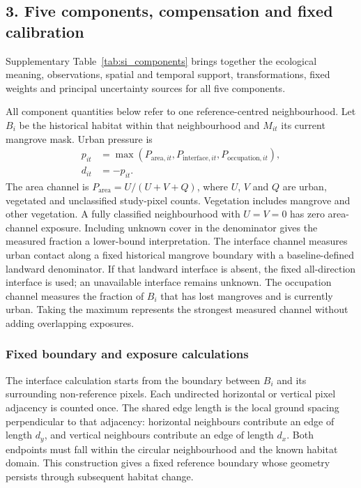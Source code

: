 \subsection{3. Five components, compensation and fixed calibration}

Supplementary Table~\ref{tab:si_components} brings together the ecological meaning, observations, spatial and temporal support, transformations, fixed weights and principal uncertainty sources for all five components.

All component quantities below refer to one reference-centred neighbourhood. Let $B_i$ be the historical habitat within that neighbourhood and $M_{it}$ its current mangrove mask. Urban pressure is
\begin{align}
p_{it}&=\max(P_{\mathrm{area},it},P_{\mathrm{interface},it},P_{\mathrm{occupation},it}),\label{eq:si_pressure}\\
d_{it}&=-p_{it}.\nonumber
\end{align}
The area channel is $P_{\mathrm{area}}=U/(U+V+Q)$, where $U$, $V$ and $Q$ are urban, vegetated and unclassified study-pixel counts. Vegetation includes mangrove and other vegetation. A fully classified neighbourhood with $U=V=0$ has zero area-channel exposure. Including unknown cover in the denominator gives the measured fraction a lower-bound interpretation. The interface channel measures urban contact along a fixed historical mangrove boundary with a baseline-defined landward denominator. If that landward interface is absent, the fixed all-direction interface is used; an unavailable interface remains unknown. The occupation channel measures the fraction of $B_i$ that has lost mangroves and is currently urban. Taking the maximum represents the strongest measured channel without adding overlapping exposures.

\subsubsection{Fixed boundary and exposure calculations}
The interface calculation starts from the boundary between $B_i$ and its surrounding non-reference pixels. Each undirected horizontal or vertical pixel adjacency is counted once. The shared edge length is the local ground spacing perpendicular to that adjacency: horizontal neighbours contribute an edge of length $d_y$, and vertical neighbours contribute an edge of length $d_x$. Both endpoints must fall within the circular neighbourhood and the known habitat domain. This construction gives a fixed reference boundary whose geometry persists through subsequent habitat change.

